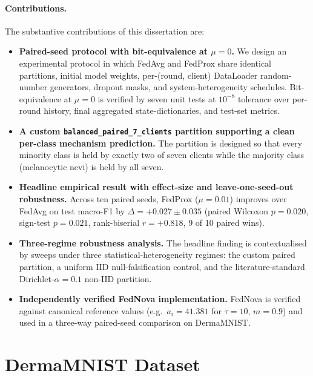 \documentclass[11pt,a4paper]{report}  %
\begin{document}
\paragraph{Contributions.} The substantive contributions of this
dissertation are:
\begin{itemize}
\item \textbf{Paired-seed protocol with bit-equivalence at $\mu = 0$.}
We design an experimental protocol in which FedAvg and FedProx share
identical partitions, initial model weights, per-(round, client)
DataLoader random-number generators, dropout masks, and
system-heterogeneity schedules. Bit-equivalence at $\mu = 0$ is
verified by seven unit tests at $10^{-8}$ tolerance over per-round
history, final aggregated state-dictionaries, and test-set metrics.

\item \textbf{A custom \texttt{balanced\_paired\_7\_clients} partition
supporting a clean per-class mechanism prediction.} The partition is
designed so that every minority class is held by exactly two of seven
clients while the majority class (melanocytic nevi) is held by all
seven.

\item \textbf{Headline empirical result with effect-size and
leave-one-seed-out robustness.} Across ten paired seeds, FedProx
($\mu = 0.01$) improves over FedAvg on test macro-F1 by
$\Delta = +0.027 \pm 0.035$ (paired Wilcoxon $p = 0.020$,
sign-test $p = 0.021$, rank-biserial $r = +0.818$, 9 of 10 paired
wins).

\item \textbf{Three-regime robustness analysis.} The headline finding
is contextualised by sweeps under three statistical-heterogeneity
regimes: the custom paired partition, a uniform IID null-falsification
control, and the literature-standard Dirichlet-$\alpha = 0.1$
non-IID partition.

\item \textbf{Independently verified FedNova implementation.} FedNova
\citep{wang2020fednova} is verified against canonical reference values
(e.g.\ $a_i = 41.381$ for $\tau = 10$, $m = 0.9$) and used in a
three-way paired-seed comparison on DermaMNIST.
\end{itemize}

\section{DermaMNIST Dataset}
\label{sec:dataset-intro}
\end{document}

